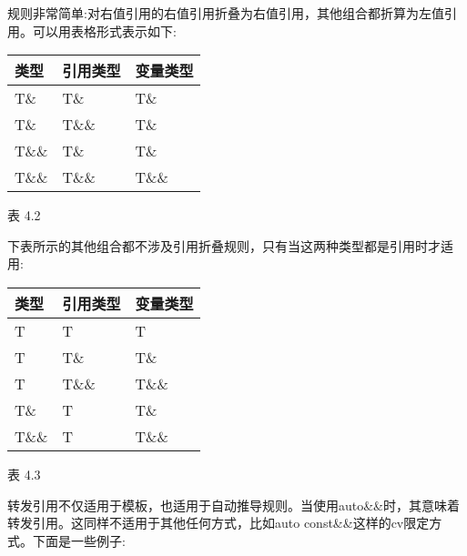 规则非常简单:对右值引用的右值引用折叠为右值引用，其他组合都折算为左值引用。可以用表格形式表示如下:

\begin{table}[H]
\centering
	\begin{tabular}{|l|l|l|}
		\hline
		\textbf{类型} & \textbf{引用类型} & \textbf{变量类型} \\ \hline
		T\&           & T\&                        & T\&                       \\ \hline
		T\&           & T\&\&                      & T\&                       \\ \hline
		T\&\&         & T\&                        & T\&                       \\ \hline
		T\&\&         & T\&\&                      & T\&\&                     \\ \hline
	\end{tabular}
\end{table}

\begin{center}
表 4.2
\end{center}

下表所示的其他组合都不涉及引用折叠规则，只有当这两种类型都是引用时才适用:

\begin{table}[H]
\centering
	\begin{tabular}{|l|l|l|}
		\hline
		\textbf{类型} & \textbf{引用类型} & \textbf{变量类型} \\ \hline
		T             & T                          & T                         \\ \hline
		T             & T\&                        & T\&                       \\ \hline
		T             & T\&\&                      & T\&\&                     \\ \hline
		T\&           & T                          & T\&                       \\ \hline
		T\&\&         & T                          & T\&\&                     \\ \hline
	\end{tabular}
\end{table}

\begin{center}
表 4.3
\end{center}

转发引用不仅适用于模板，也适用于自动推导规则。当使用auto\&\&时，其意味着转发引用。这同样不适用于其他任何方式，比如auto const\&\&这样的cv限定方式。下面是一些例子:

